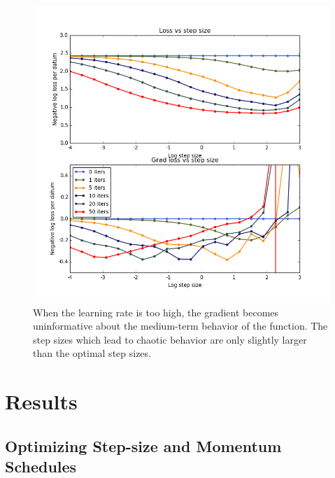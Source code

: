 \documentclass{article}
\begin{document}
\begin{figure}[h!]
\vskip 0.2in
\begin{center}
\centerline{\includegraphics[width=\columnwidth]{../experiments/Jan_14_learning_rate_wiggliness/1/fig.png}}
\caption{When the learning rate is too high, the gradient becomes uninformative about the medium-term behavior of the function.
The step sizes which lead to chaotic behavior are only slightly larger than the optimal step sizes.}
\label{fig:chaos}
\end{center}
\vskip -0.2in
\end{figure} 




\section{Results}

\subsection{Optimizing Step-size and Momentum Schedules}
\end{document}
